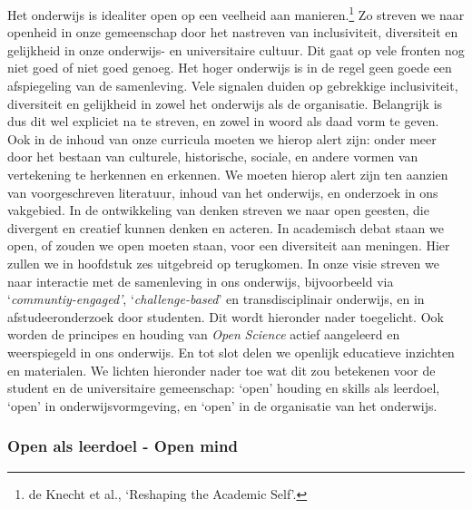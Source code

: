 \documentclass[smallauthor, chapterhaspagenum, nochapterinheader, pagenuminheader,  bigchapnum,medium2, tocpages, garamond, titleinheader]{jote-book}
\begin{document}
	Het onderwijs is idealiter open op een veelheid aan manieren.\footnote{de Knecht et al., ‘Reshaping the Academic Self'.} Zo streven we naar openheid in onze gemeenschap door het nastreven van inclusiviteit, diversiteit en gelijkheid in onze onderwijs- en universitaire cultuur. Dit gaat op vele fronten nog niet goed of niet goed genoeg. Het hoger onderwijs is in de regel geen goede een afspiegeling van de samenleving. Vele signalen duiden op gebrekkige inclusiviteit, diversiteit en gelijkheid in zowel het onderwijs als de organisatie. Belangrijk is dus dit wel expliciet na te streven, en zowel in woord als daad vorm te geven. Ook in de inhoud van onze curricula moeten we hierop alert zijn: onder meer door het bestaan van culturele, historische, sociale, en andere vormen van vertekening te herkennen en erkennen. We moeten hierop alert zijn ten aanzien van voorgeschreven literatuur, inhoud van het onderwijs, en onderzoek in ons vakgebied. In de ontwikkeling van denken streven we naar open geesten, die divergent en creatief kunnen denken en acteren. In academisch debat staan we open, of zouden we open moeten staan, voor een diversiteit aan meningen. Hier zullen we in hoofdstuk zes uitgebreid op terugkomen. In onze visie streven we naar interactie met de samenleving in ons onderwijs, bijvoorbeeld via ‘\emph{communtiy-engaged'}, ‘\emph{challenge-based}' en transdisciplinair onderwijs, en in afstudeeronderzoek door studenten. Dit wordt hieronder nader toegelicht. Ook worden de principes en houding van \emph{Open }\emph{Science} actief aangeleerd en weerspiegeld in ons onderwijs. En tot slot delen we openlijk educatieve inzichten en materialen. We lichten hieronder nader toe wat dit zou betekenen voor de student en de universitaire gemeenschap: ‘open' houding en skills als leerdoel, ‘open' in onderwijsvormgeving, en ‘open' in de organisatie van het onderwijs.



	\subsubsection{Open als leerdoel - Open mind}

	\enlargethispage{-\baselineskip}\checkandfixthelayout
\end{document}
